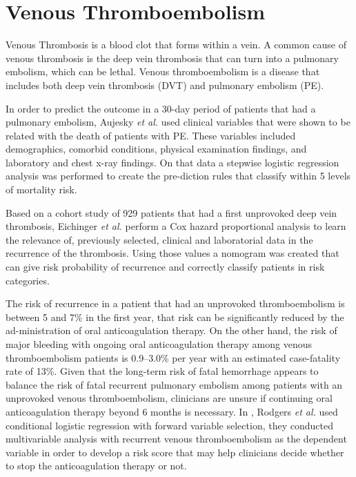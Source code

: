 \section{Venous Thromboembolism}
\label{section:venous}

Venous Thrombosis is a blood clot that forms within a vein. A common cause of venous thrombosis is the deep vein thrombosis that can turn into a pulmonary
 embolism, which can be lethal. Venous thromboembolism is a disease that includes both deep vein thrombosis (DVT) and pulmonary embolism (PE). 

In order to predict the outcome in a 30-day period of patients that had a pulmonary embolism, Aujesky \emph{et al.} used clinical variables 
that were shown to be related with the death of patients with PE. These variables included demographics, comorbid conditions, physical
 examination findings, and laboratory and chest x-ray findings. On that data a stepwise logistic regression analysis was performed to
 create the pre-diction rules that classify within 5 levels of mortality risk. \cite{Aujesky2005} 

\cite{Eichinger2010} Based on a cohort study of 929 patients that had a first unprovoked deep vein thrombosis, Eichinger \emph{et al.} perform 
a Cox hazard proportional analysis to learn the relevance of, previously selected, clinical and laboratorial data in the recurrence of the
 thrombosis. Using those values a nomogram was created that can give risk probability of recurrence and correctly classify patients in risk categories. 

The risk of recurrence in a patient that had an unprovoked thromboembolism is between 5 and 7\% in the first year, that risk can be
 significantly reduced by the ad-ministration of oral anticoagulation therapy. On the other hand, the risk of major bleeding with ongoing 
 oral anticoagulation therapy among venous thromboembolism patients is 0.9–3.0\% per year with an estimated case-fatality rate of 13\%.
 Given that the long-term risk of fatal hemorrhage appears to balance the risk of fatal recurrent pulmonary embolism among patients
 with an unprovoked venous thromboembolism, clinicians are unsure if continuing oral anticoagulation therapy beyond 6 months is
 necessary. In \cite{Rodger2008}, Rodgers \emph{et al.} used conditional logistic regression with forward variable selection, they conducted
 multivariable analysis with recurrent venous thromboembolism as the dependent variable in order to develop a risk score that may help
 clinicians decide whether to stop the anticoagulation therapy or not. 

